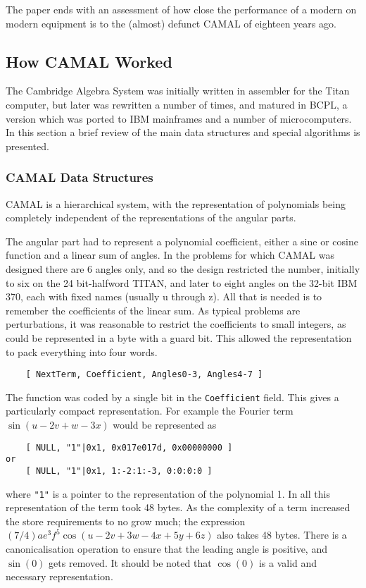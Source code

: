 The paper ends with an assessment of how close the performance of a
modern \REDUCE on modern equipment is to the (almost) defunct CAMAL of
eighteen years ago.

\subsection{How CAMAL Worked}

The Cambridge Algebra System was initially written in assembler for
the Titan computer, but later was rewritten a number of times, and
matured in BCPL, a version which was ported to IBM mainframes and a
number of microcomputers.  In this section a brief review of the main
data structures and special algorithms is presented.

\subsubsection{CAMAL Data Structures}

CAMAL is a hierarchical system, with the representation of polynomials
being completely independent of the representations of the angular
parts.

The angular part had to represent a polynomial coefficient, either a
sine or cosine function and a linear sum of angles.  In the problems
for which CAMAL was designed there are 6 angles only, and so the
design restricted the number, initially to six on the 24 bit-halfword
TITAN, and later to eight angles on the 32-bit IBM 370, each with
fixed names (usually u through z).  All that is needed is to remember
the coefficients of the linear sum.  As typical problems are
perturbations, it was reasonable to restrict the coefficients to small
integers, as could be represented in a byte with a guard bit.  This
allowed the representation to pack everything into four words.
\begin{verbatim}
    [ NextTerm, Coefficient, Angles0-3, Angles4-7 ]
\end{verbatim}
The function was coded by a single bit in the {\tt Coefficient} field.  This
gives a particularly compact representation.  For example the Fourier
term $\sin(u-2v+w-3x)$ would be represented as
\begin{verbatim}
    [ NULL, "1"|0x1, 0x017e017d, 0x00000000 ]
or
    [ NULL, "1"|0x1, 1:-2:1:-3, 0:0:0:0 ]
\end{verbatim}
where \texttt{"1"} is a pointer to the representation of the polynomial
1.  In all this representation of the term took 48 bytes.  As the
complexity of a term increased the store requirements to no grow much;
the expression $(7/4) a e^3 f^5 \cos(u-2v+3w-4x+5y+6z)$ also takes 48
bytes.  There is a canonicalisation operation to ensure that the
leading angle is positive, and $\sin(0)$ gets removed.  It should be
noted that $\cos(0)$ is a valid and necessary representation.

